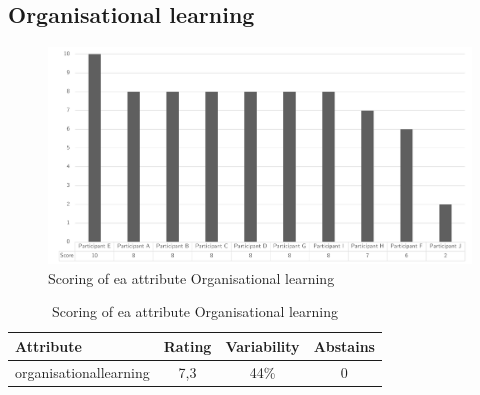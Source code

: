 \subsection{Organisational learning}
\begin{figure}[H]
	\centering
	\includegraphics[width=0.9\linewidth]{images/scoreeaorganisationallearning}
	\caption[Scoring of \gls{ea} attribute Organisational learning]{Scoring of \gls{ea} attribute Organisational learning}
	\label{fig:appscoringeaorganiationallearning}
\end{figure}
\begin{table}[H]
	\centering
	\begin{tabular}{p{}ccc}
		\toprule
		\textbf{Attribute} & \textbf{Rating} & \textbf{Variability} & \textbf{Abstains} \\
		\midrule
		\Gls{organisationallearning} & 7,3 & 44\% & 0 \\%
		\bottomrule
	\end{tabular}%
	\caption[Scoring of \gls{ea} attribute Organisational learning]{Scoring of \gls{ea} attribute Organisational learning}
	\label{tab:appscoringeaorganisationallearning}%
\end{table}%
\newpage

